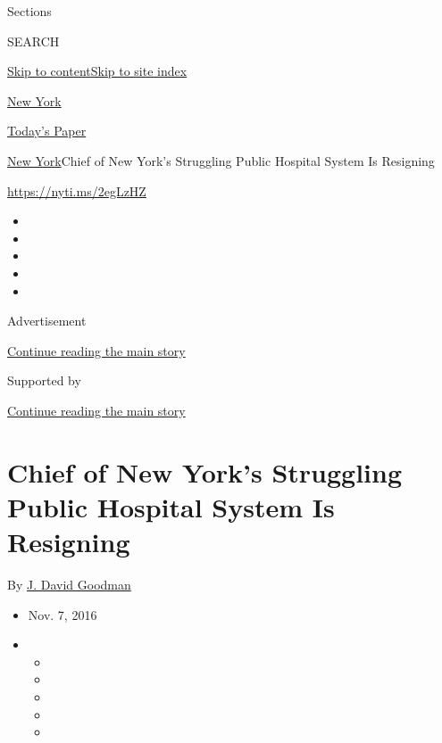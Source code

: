 Sections

SEARCH

\protect\hyperlink{site-content}{Skip to
content}\protect\hyperlink{site-index}{Skip to site index}

\href{https://www.nytimes3xbfgragh.onion/section/nyregion}{New York}

\href{https://myaccount.nytimes3xbfgragh.onion/auth/login?response_type=cookie\&client_id=vi}{}

\href{https://www.nytimes3xbfgragh.onion/section/todayspaper}{Today's
Paper}

\href{/section/nyregion}{New York}\textbar{}Chief of New York's
Struggling Public Hospital System Is Resigning

\url{https://nyti.ms/2egLzHZ}

\begin{itemize}
\item
\item
\item
\item
\item
\end{itemize}

Advertisement

\protect\hyperlink{after-top}{Continue reading the main story}

Supported by

\protect\hyperlink{after-sponsor}{Continue reading the main story}

\hypertarget{chief-of-new-yorks-struggling-public-hospital-system-is-resigning}{%
\section{Chief of New York's Struggling Public Hospital System Is
Resigning}\label{chief-of-new-yorks-struggling-public-hospital-system-is-resigning}}

By \href{http://www.nytimes3xbfgragh.onion/by/j-david-goodman}{J. David
Goodman}

\begin{itemize}
\item
  Nov. 7, 2016
\item
  \begin{itemize}
  \item
  \item
  \item
  \item
  \item
  \end{itemize}
\end{itemize}

